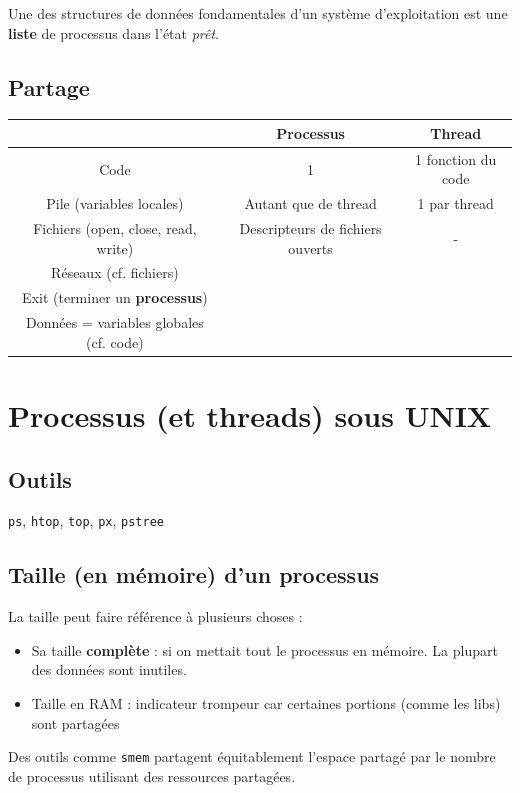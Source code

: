 \documentclass[11pt]{article}
\begin{document}
Une des structures de données fondamentales d'un système d'exploitation est une \textbf{liste} de processus dans l'état \textit{prêt}.


\subsection{Partage}

\begin{center}
    \begin{tabular}{ |c|c|c| }
        \hline
        & Processus & Thread \\
        \hline\hline
        Code & 1 & 1 fonction du code \\
        \hline
        Pile (variables locales) & Autant que de thread & 1 par thread \\
        \hline
        Fichiers (open, close, read, write) & Descripteurs de fichiers ouverts & - \\
        \hline
        Réseaux (cf. fichiers) & & \\
        \hline
        Exit (terminer un \textbf{processus}) & &\\
        \hline
        Données = variables globales (cf. code) & &\\
        \hline
    \end{tabular}
\end{center}

\section{Processus (et threads) sous UNIX}
\subsection{Outils}
\texttt{ps}, \texttt{htop}, \texttt{top}, \texttt{px}, \texttt{pstree}

\subsection{Taille (en mémoire) d'un processus}
La taille peut faire référence à plusieurs choses :
\begin{itemize}
    \item Sa taille \textbf{complète} : si on mettait tout le processus en mémoire. La plupart des données sont inutiles.
    \item Taille en RAM : indicateur trompeur car certaines portions (comme les libs) sont partagées 
\end{itemize}
Des outils comme \texttt{smem} partagent équitablement l'espace partagé par le nombre de processus utilisant des ressources partagées.
\end{document}
